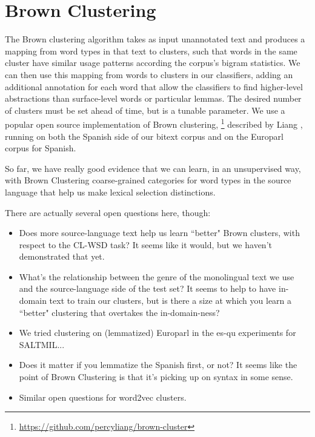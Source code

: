 \section{Brown Clustering}
The Brown clustering algorithm takes as input unannotated text and produces a
mapping from word types in that text to clusters, such that words in the same
cluster have similar usage patterns according the corpus's bigram statistics.
We can then use this mapping from words to clusters in our classifiers, adding
an additional annotation for each word that allow the classifiers to find
higher-level abstractions than surface-level words or particular lemmas.
The desired number of clusters must be set ahead of time, but is a tunable
parameter.
We use a popular open source implementation of Brown clustering,
\footnote{\url{https://github.com/percyliang/brown-cluster}} described by
Liang \cite{Liang05semi-supervisedlearning}, running on both the Spanish
side of our bitext corpus and on the Europarl corpus \cite{europarl} for
Spanish.


So far, we have really good evidence that we can learn, in an unsupervised way,
with Brown Clustering coarse-grained categories for word types in the source
language that help us make lexical selection distinctions.

There are actually several open questions here, though:

\begin{itemize}
  \item Does more source-language text help us learn ``better" Brown clusters,
    with respect to the CL-WSD task? It seems like it would, but we haven't
    demonstrated that yet.
  \item What's the relationship between the genre of the monolingual text we
    use and the source-language side of the test set? It seems to help to have
    in-domain text to train our clusters, but is there a size at which you
    learn a ``better" clustering that overtakes the in-domain-ness?
  \item We tried clustering on (lemmatized) Europarl in the es-qu experiments for SALTMIL...
  \item Does it matter if you lemmatize the Spanish first, or not? It seems
    like the point of Brown Clustering is that it's picking up on syntax in
    some sense.
  \item Similar open questions for word2vec clusters.
\end{itemize}

